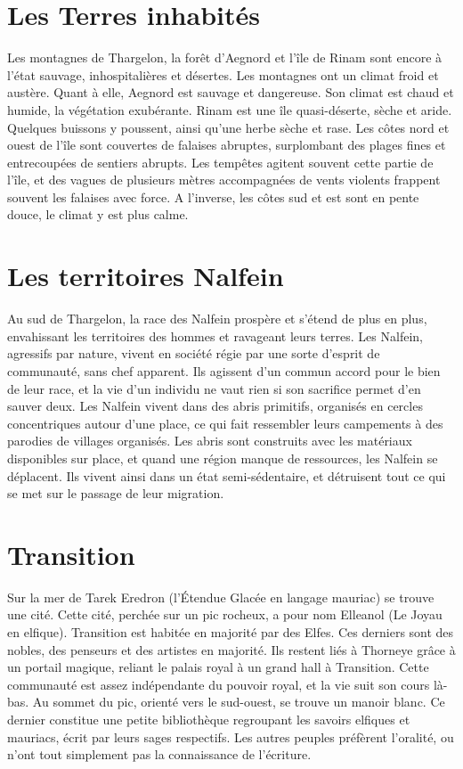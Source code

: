 \section{Les Terres inhabités}
Les montagnes de Thargelon, la forêt d'Aegnord et l'île de Rinam sont encore à l'état sauvage, inhospitalières et désertes. Les montagnes ont un climat froid et austère. Quant à elle, Aegnord est sauvage et dangereuse. Son climat est chaud et humide, la végétation exubérante. 
\newline
Rinam est une île quasi-déserte, sèche et aride. Quelques buissons y poussent, ainsi qu'une herbe sèche et rase. Les côtes nord et ouest de l'île sont couvertes de falaises abruptes, surplombant des plages fines et entrecoupées de sentiers abrupts. Les tempêtes agitent souvent cette partie de l'île, et des vagues de plusieurs mètres accompagnées de vents violents frappent souvent les falaises avec force. A l'inverse, les côtes sud et est sont en pente douce, le climat y est plus calme.
\section{Les territoires Nalfein}
Au sud de Thargelon, la race des Nalfein prospère et s'étend de plus en plus, envahissant les territoires des hommes et ravageant leurs terres. Les Nalfein, agressifs par nature, vivent en société régie par une sorte d'esprit de communauté, sans chef apparent. Ils agissent d'un commun accord pour le bien de leur race, et la vie d'un individu ne vaut rien si son sacrifice permet d'en sauver deux. Les Nalfein vivent dans des abris primitifs, organisés en cercles concentriques autour d'une place, ce qui fait ressembler leurs campements à des parodies de villages organisés. Les abris sont construits avec les matériaux disponibles sur place, et quand une région manque de ressources, les Nalfein se déplacent. Ils vivent ainsi dans un état semi-sédentaire, et détruisent tout ce qui se met sur le passage de leur migration.
\section{Transition}
Sur la mer de Tarek Eredron (l'Étendue Glacée en langage mauriac) se trouve une cité. Cette cité, perchée sur un pic rocheux, a pour nom Elleanol (Le Joyau en elfique). Transition est habitée en majorité par des Elfes. Ces derniers sont des nobles, des penseurs et des artistes en majorité. Ils restent liés à Thorneye grâce à un portail magique, reliant le palais royal à un grand hall à Transition. Cette communauté est assez indépendante du pouvoir royal, et la vie suit son cours là-bas.
\newline
Au sommet du pic, orienté vers le sud-ouest, se trouve un manoir blanc. Ce dernier constitue une petite bibliothèque regroupant les savoirs elfiques et mauriacs, écrit par leurs sages respectifs. Les autres peuples préfèrent l'oralité, ou n'ont tout simplement pas la connaissance de l'écriture.